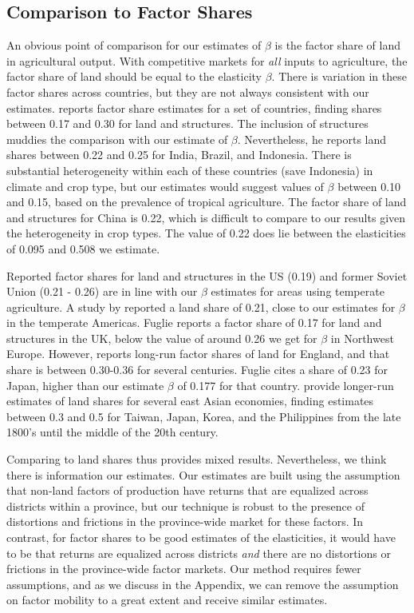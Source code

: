 \documentclass[11pt]{article}
\begin{document}
\subsection{Comparison to Factor Shares}
An obvious point of comparison for our estimates of $\beta$ is the factor share of land in agricultural output. With competitive markets for \textit{all} inputs to agriculture, the factor share of land should be equal to the elasticity $\beta$. There is variation in these factor shares across countries, but they are not always consistent with our estimates. \citet{fuglie2010} reports factor share estimates for a set of countries, finding shares between 0.17 and 0.30 for land and structures. The inclusion of structures muddies the comparison with our estimate of $\beta$. Nevertheless, he reports land shares between 0.22 and 0.25 for India, Brazil, and Indonesia. There is substantial heterogeneity within each of these countries (save Indonesia) in climate and crop type, but our estimates would suggest values of $\beta$ between 0.10 and 0.15, based on the prevalence of tropical agriculture. The factor share of land and structures for China is 0.22, which is difficult to compare to our results given the heterogeneity in crop types. The value of 0.22 does lie between the elasticities of 0.095 and 0.508 we estimate.

Reported factor shares for land and structures in the US (0.19) and former Soviet Union (0.21 - 0.26) are in line with our $\beta$ estimates for areas using temperate agriculture. A study by \citet{jg1992} reported a land share of 0.21, close to our estimates for $\beta$ in the temperate Americas. Fuglie reports a factor share of 0.17 for land and structures in the UK, below the value of around 0.26 we get for $\beta$ in Northwest Europe. However, \citet{Clark2002} reports long-run factor shares of land for England, and that share is between 0.30-0.36 for several centuries. Fuglie cites a share of 0.23 for Japan, higher than our estimate $\beta$ of 0.177 for that country. \citet{hrs1979} provide longer-run estimates of land shares for several east Asian economies, finding estimates between 0.3 and 0.5 for Taiwan, Japan, Korea, and the Philippines from the late 1800's until the middle of the 20th century.

Comparing to land shares thus provides mixed results. Nevertheless, we think there is information our estimates. Our estimates are built using the assumption that non-land factors of production have returns that are equalized across districts within a province, but our technique is robust to the presence of distortions and frictions in the province-wide market for these factors. In contrast, for factor shares to be good estimates of the elasticities, it would have to be that returns are equalized across districts \textit{and} there are no distortions or frictions in the province-wide factor markets. Our method requires fewer assumptions, and as we discuss in the Appendix, we can remove the assumption on factor mobility to a great extent and receive similar estimates. 
\end{document}
